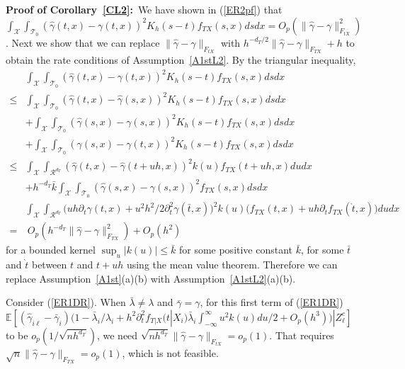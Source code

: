 \documentclass[lettersize, 12pt]{article}
\begin{document}
\textbf{Proof of Corollary~\ref{CL2}:}\
We have shown in (\ref{ER2pf}) that 
$\int_\mathcal{X}\int_{\mathcal{T}_0} (\hat \gamma(t,x) - \gamma(t,x))^2 K_h(s-t) f_{TX}(s,x) ds dx = O_p(\|\hat\gamma - \gamma\|_{F_{tX}}^2)$.
Next we show that we can replace
$\|\hat\gamma - \gamma\|_{F_{tX}}$ with $h^{-d_T/2}\|\hat \gamma - \gamma\|_{F_{TX}} + h$ to obtain the rate conditions of Assumption~\ref{A1stL2}.
By the triangular inequality,
\begin{align*}
&\int_\mathcal{X}\int_{\mathcal{T}_0} (\hat \gamma(t,x) - \gamma(t,x))^2 K_h(s-t) f_{TX}(s,x) ds dx \\
\leq &
\int_\mathcal{X}\int_{\mathcal{T}_0} (\hat \gamma(t,x) - \hat \gamma(s,x))^2 K_h(s-t) f_{TX}(s,x) ds dx
\\
&+ \int_\mathcal{X}\int_{\mathcal{T}_0} (\hat \gamma(s,x) - \gamma(s,x))^2 K_h(s-t) f_{TX}(s,x) ds dx
\\
&+ \int_\mathcal{X}\int_{\mathcal{T}_0} (\gamma(s,x) - \gamma(t,x))^2 K_h(s-t) f_{TX}(s,x) ds dx
\\
\leq &
\int_\mathcal{X}\int_{\mathcal{R}^{d_T}} (\hat \gamma(t,x) - \hat \gamma(t+uh,x))^2 k(u) f_{TX}(t+uh,x) du dx 
\\
&+ h^{-d_T} \bar k \int_\mathcal{X}\int_{\mathcal{T}_0} (\hat \gamma(s,x) - \gamma(s,x))^2 f_{TX}(s,x) ds dx 
\\
&\int_\mathcal{X}\int_{\mathcal{R}^{d_T}} \big(uh \partial_t \gamma(t,x) + u^2 h^2 /2 \partial_t^2 \gamma(\bar t,x)\big)^2 k(u) \big(f_{TX}(t,x)  + uh \partial_t f_{TX}(\grave t, x)\big) du dx 
\\
= &\ 
O_p(h^{-d_T}\|\hat \gamma - \gamma\|_{F_{TX}}^2) + O_p(h^2)
\end{align*}
for a bounded kernel $\sup_u |k(u)| \leq \bar k$ for some positive constant $\bar k$,
for some $\bar t$ and $\grave t$ between $t$ and $t + uh$ using the mean value theorem.
Therefore we can replace Assumption~\ref{A1st}(a)(b) with Assumption~\ref{A1stL2}(a)(b).

Consider (\ref{ER1DR}).
When $\bar\lambda \neq \lambda$ and $\bar \gamma = \gamma$, 
for this first term of (\ref{ER1DR}) $\mathbb{E}[(\hat\gamma_{i\ell} - \bar{\gamma}_i)
(1 - \bar{\lambda}_i/\lambda_i + h^2 \partial_t^2 f_{T|X}(t|X_i) \bar{\lambda}_i \int_{-\infty}^\infty u^2k(u) du/2  + O_p(h^3))
|Z_\ell^c]$ to be $o_p(1/\sqrt{n h^{d_T}})$,
we need $\sqrt{nh^{d_T}}\|\hat \gamma - \gamma\|_{F_{tX}} = o_p(1)$.
That requires $\sqrt{n}\|\hat \gamma - \gamma\|_{F_{TX}} = o_p(1)$, which is not feasible.
\end{document}
